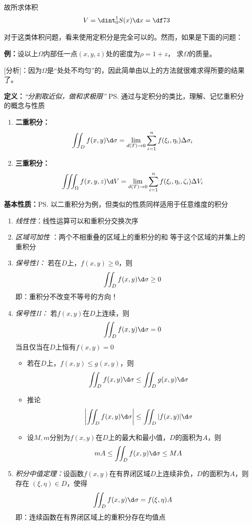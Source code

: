 故所求体积
$$V=\dint_0^1S(x)\d x=\df 73$$

对于这类体积问题，看来使用定积分是完全可以的。然而，如果是下面的问题：

{\bf 例：}设以上$\Omega$内部任一点$(x,y,z)$处的密度为$\rho=1+z$，
求$\Omega$的质量。

[分析]：因为$\Omega$是“处处不均匀”的，因此简单由以上的方法就很难求得所要的结果了。


{\bf 定义：}{\it “分割取近似，做和求极限”}
\ps{通过与定积分的类比，理解、记忆重积分的概念与性质}
\begin{enumerate}[(1)]
  \setlength{\itemindent}{1cm}
  \item {\bf 二重积分：} 
  $$\iint_Df(x,y)\d\sigma=\lim_{d(T)\to
  0}\sum_{i=1}^nf(\xi_i,\eta_i)\Delta\sigma_i$$ 
  \item {\bf 三重积分：} 
  $$\iiint_{\Omega}f(x,y,z)\d V=\lim_{d(T)\to
  0}\sum_{i=1}^nf(\xi_i,\eta_i,\zeta_i)\Delta V_i$$
\end{enumerate}

{\bf 基本性质：}\ps{以二重积分为例，但类似的性质同样适用于任意维度的积分}
\begin{enumerate}[(1)]
  \setlength{\itemindent}{1cm}
  \item {\it 线性性}：线性运算可以和重积分交换次序 
  \item {\it 区域可加性} ：两个不相重叠的区域上的重积分的和
  等于这个区域的并集上的重积分
  \item {\it 保号性I：} 若在$D$上，$f(x,y)\geq 0$，则
  $$\iint_Df(x,y)\d\sigma\geq 0$$ 
  即：重积分不改变不等号的方向！
  \item {\it 保号性II：} 若$f(x,y)$在$D$上连续，则
  $$\iint_Df(x,y)\d\sigma=0$$
  当且仅当在$D$上恒有$f(x,y)=0$
    \begin{itemize}
	  \item 若在$D$上，$f(x,y)\leq g(x,y)$，则
	  $$\iint_Df(x,y)\d\sigma\leq\iint_Dg(x,y)\d\sigma$$ 
	  \item 推论
	  $$\left|\iint_Df(x,y)\d\sigma\right|\leq\iint_D|f(x,y)|\d\sigma$$ 
	  \item 设$M,m$分别为$f(x,y)$在$D$上的最大和最小值，$D$的面积为$A$，则
	  $$mA\leq\iint_Df(x,y)\d\sigma\leq MA$$
	\end{itemize}
  \item {\it 积分中值定理：}设函数$f(x,y)$在有界闭区域$D$上连续非负，$D$的面积为$A$，则存在
	$(\xi,\eta)\in D$，使得
	$$\iint_Df(x,y)\d\sigma=f(\xi,\eta)A$$
  即：连续函数在有界闭区域上的重积分存在均值点
\end{enumerate}

